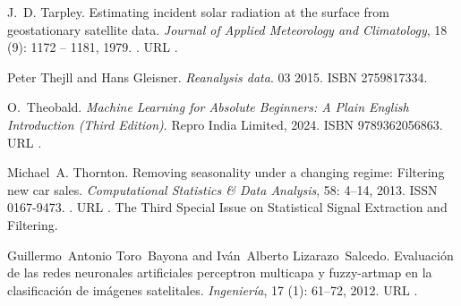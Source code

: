 \documentclass[letterpaper,12pt, twoside]{report}
\providecommand{\DIFdeltex}[1]{{\protect\color{red} \scriptsize #1}} %
\providecommand{\DIFdel}[1]{\texorpdfstring{\DIFdeltex{#1}}{}} %
\begin{document}
\DIFdel{J.~D. Tarpley.
}%
\DIFdel{Estimating incident solar radiation at the surface from geostationary
  satellite data.
}%
\DIFdel{\emph{Journal of Applied Meteorology and Climatology}, 18}%
\DIFdel{(9):}%
\DIFdel{1172 -- 1181, 1979.
}%
\DIFdel{.
}%
\DIFdel{URL
  }%
\DIFdel{.
}%

\DIFdel{Peter Thejll and Hans Gleisner.
}%
\DIFdel{\emph{Reanalysis data}.
}%
\DIFdel{03 2015.
}%
\DIFdel{ISBN 2759817334.
}%

\DIFdel{O.~Theobald.
}%
\DIFdel{\emph{Machine Learning for Absolute Beginners: A Plain English
  Introduction (Third Edition)}.
}%
\DIFdel{Repro India Limited, 2024.
}%
\DIFdel{ISBN 9789362056863.
}%
\DIFdel{URL }%
\DIFdel{.
}%

\DIFdel{Michael~A. Thornton.
}%
\DIFdel{Removing seasonality under a changing regime: Filtering new car
  sales.
}%
\DIFdel{\emph{Computational Statistics \& Data Analysis}, 58:}%
\DIFdel{4--14,
  2013.
}%
\DIFdel{ISSN 0167-9473.
}%
\DIFdel{.
}%
\DIFdel{URL
  }%
\DIFdel{.
}%
\DIFdel{The Third Special Issue on Statistical Signal Extraction and
  Filtering.
}%

\DIFdel{Guillermo~Antonio Toro~Bayona and Iván~Alberto Lizarazo~Salcedo.
}%
\DIFdel{Evaluación de las redes neuronales artificiales perceptron multicapa
  y fuzzy-artmap en la clasificación de imágenes satelitales.
}%
\DIFdel{\emph{Ingeniería}, 17}%
\DIFdel{(1):}%
\DIFdel{61--72, 2012.
}%
\DIFdel{URL }%
\DIFdel{.
}%
\end{document}
